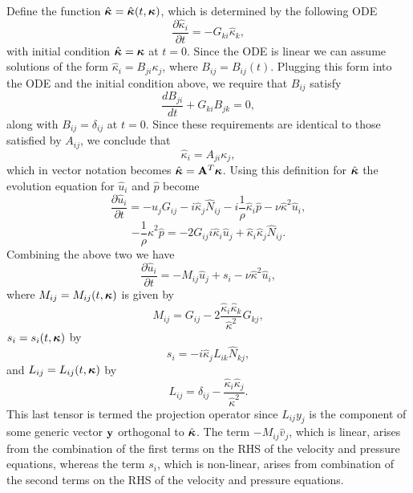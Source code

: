\documentclass[oneside,a4paper,11pt]{report}
\begin{document}
Define the function $\hat{\boldsymbol\kappa} = \hat{\boldsymbol\kappa}(t,\boldsymbol\kappa)$, which is determined by the following ODE
\begin{equation}
\frac{\partial \hat{\kappa}_i}{\partial t} = -G_{ki} \hat{\kappa}_k,
\end{equation}
with initial condition $\hat{\boldsymbol\kappa} = \boldsymbol\kappa$ at $t = 0$. Since the ODE is linear we can assume solutions of the form $\hat{\kappa}_i = B_{ji} \kappa_j$, where $B_{ij} = B_{ij}(t)$. Plugging this form into the ODE and the initial condition above, we require that $B_{ij}$ satisfy
\begin{equation}
\frac{d B_{ji}}{dt} + G_{ki} B_{jk} = 0,
\end{equation}
along with $B_{ij} = \delta_{ij}$ at $t=0$. Since these requirements are identical to those satisfied by $A_{ij}$, we conclude that 
\begin{equation}
\hat{\kappa}_i = A_{ji} \kappa_j,
\end{equation}
which in vector notation becomes $\hat{\boldsymbol\kappa} = \mathbf{A}^T\boldsymbol\kappa$. Using this definition for $\hat{\boldsymbol\kappa}$ the evolution equation for $\hat{u}_i$ and $\hat{p}$ become
\begin{equation}
\frac{\partial \hat{u}_i }{\partial t } = -\hat{u}_j G_{ij} - i \hat{\kappa}_j  \hat{N}_{ij} - i\frac{1}{\rho} \hat{\kappa}_i  \hat{p} - \nu  \hat{\kappa}^2 \hat{u}_i,
\end{equation}
\begin{equation}
-\frac{1}{\rho} \hat{\kappa}^2 \hat{p} = -2 G_{ij} i \hat{\kappa}_i \hat{u}_j + \hat{\kappa}_i \hat{\kappa}_j \hat{N}_{ij}.
\end{equation}
Combining the above two we have
\begin{equation}
\label{vhat_evol_homo}
\frac{\partial \hat{u}_i }{\partial t } = -M_{ij}\hat{u}_j + s_i  - \nu  \hat{\kappa}^2 \hat{u}_i,
\end{equation}
where $M_{ij} = M_{ij}(t,\boldsymbol\kappa)$ is given by
\begin{equation}
M_{ij} = G_{ij} - 2 \frac{\hat{\kappa}_i \hat{\kappa}_k}{\hat{\kappa}^2} G_{kj},
\end{equation}
$s_{i} = s_{i}(t,\boldsymbol\kappa)$ by
\begin{equation}
s_{i} = -i \hat{\kappa}_j L_{ik}\hat{N}_{kj},
\end{equation}
and $L_{ij} = L_{ij}(t,\boldsymbol\kappa)$ by
\begin{equation}
L_{ij} = \delta_{ij} - \frac{ \hat{\kappa}_i \hat{\kappa}_j}{\hat{\kappa}^2}.
\end{equation}
This last tensor is termed the projection operator since $L_{ij} y_j$ is the component of some generic vector $\mathbf{y}$ orthogonal to $\hat{\boldsymbol\kappa}$. The term $-M_{ij}\hat{v}_j$, which is linear, arises from the combination of the first terms on the RHS of the velocity and pressure equations, whereas the term $s_{i}$, which is non-linear, arises from combination of the second terms on the RHS of the velocity and pressure equations.
\end{document}

